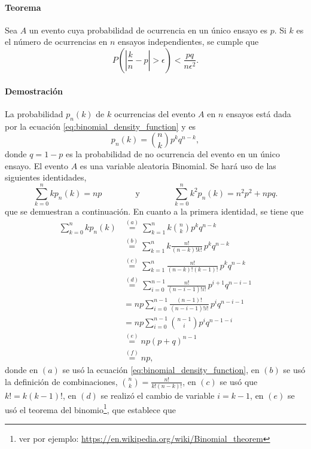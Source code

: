 \documentclass[a4paper]{report}
\begin{document}
\paragraph{Teorema} Sea \(A\) un evento cuya probabilidad de ocurrencia en un único ensayo es \(p\). Si \(k\) es el número de ocurrencias en \(n\) ensayos independientes, se cumple que
\begin{equation}\label{eq:bernoulli_theorem}
 P\left(\left|\frac{k}{n}-p\right|>\epsilon\right)<\frac{pq}{n\epsilon^2}.
\end{equation}

\paragraph{Demostración} La probabilidad \(p_n(k)\) de \(k\) ocurrencias del evento \(A\) en \(n\) ensayos está dada por la ecuación \ref{eq:binomial_density_function} y es 
\begin{equation*}
 p_n(k)=\binom{n}{k}p^kq^{n-k},
\end{equation*}
donde \(q=1-p\) es la probabilidad de no ocurrencia del evento en un único ensayo. El evento \(A\) es una variable aleatoria Binomial. Se hará uso de las siguientes identidades,
\begin{equation}\label{eq:bernoulli_aux_identities1}
 \sum_{k=0}^{n}kp_n(k)=np\qquad\qquad\textrm{y}\qquad\qquad\sum_{k=0}^{n}k^2p_n(k)=n^2p^2+npq.
\end{equation}
que se demuestran a continuación.
En cuanto a la primera identidad, se tiene que
\begin{align*}
 \sum_{k=0}^{n}kp_n(k)&\overset{(a)}{=}\sum_{k=1}^{n}k\binom{n}{k}p^kq^{n-k}\\
   &\overset{(b)}{=}\sum_{k=1}^{n}k\frac{n!}{(n-k)!k!}\,p^kq^{n-k}\\
   &\overset{(c)}{=}\sum_{k=1}^{n}\frac{n!}{(n-k)!(k-1)!}\,p^kq^{n-k}\\
   &\overset{(d)}{=}\sum_{i=0}^{n-1}\frac{n!}{(n-i-1)!i!}\,p^{i+1}q^{n-i-1}\\
   &=np\sum_{i=0}^{n-1}\frac{(n-1)!}{(n-i-1)!i!}\,p^iq^{n-i-1}\\
   &=np\sum_{i=0}^{n-1}\binom{n-1}{i}p^iq^{n-1-i}\\
   &\overset{(e)}{=}np(p+q)^{n-1}\\
   &\overset{(f)}{=}np,
\end{align*}
donde en \((a)\) se usó la ecuación \ref{eq:binomial_density_function}, en \((b)\) se usó la definición de combinaciones, \(\binom{n}{k}=\frac{n!}{k!(n-k)!}\), en \((c)\) se usó que \(k!=k(k-1)!\), en \((d)\) se realizó el cambio de variable \(i=k-1\), en \((e)\) se usó el teorema del binomio\footnote{ver por ejemplo: \url{https://en.wikipedia.org/wiki/Binomial_theorem}}, que establece que
\end{document}
